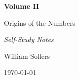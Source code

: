 \begin{titlepage}
\centering

\vspace*{5cm}

{\Huge\bfseries Volume II\par}

\vspace{0.5cm}

{\LARGE Origins of the Numbers\par}

\vspace{0.5cm}

{\large\itshape Self-Study Notes\par}

\vfill

{\large William Sollers\par}

\vspace{0.5cm}

{\large \today\par}

\end{titlepage}
